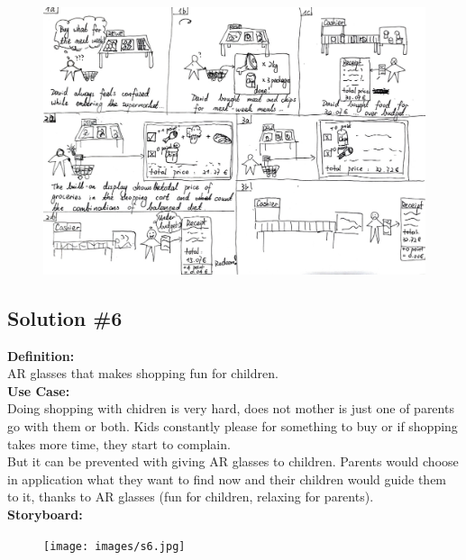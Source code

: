 \documentclass[a4paper,10pt,oneside]{scrreprt}
\begin{document}
				\begin{figure}[h]
					\centering
					\includegraphics[scale=0.4, clip, trim={0em 0em 0em 0em}]{images/s5.jpg}
				\end{figure}

			\clearpage
			
		\subsection{Solution \#6}
		
		\noindent \textbf{Definition:}\\
		AR glasses that makes shopping fun for children.\\
		
		
		\noindent \textbf{Use Case:}\\
		Doing shopping with chidren is very hard, does not mother is just one of parents go with them or both. Kids constantly please for something to buy or if shopping takes more time, they start to complain.\\
		
		But it can be prevented with giving AR glasses to children. Parents would choose in application what they want to find now and their children would guide them to it, thanks to AR glasses (fun for children, relaxing for parents).\\
		
		
			\noindent \textbf{Storyboard:}\\

			\begin{figure}[h]
				\centering
				\texttt{[image: images/s6.jpg]}
			\end{figure}
\end{document}

